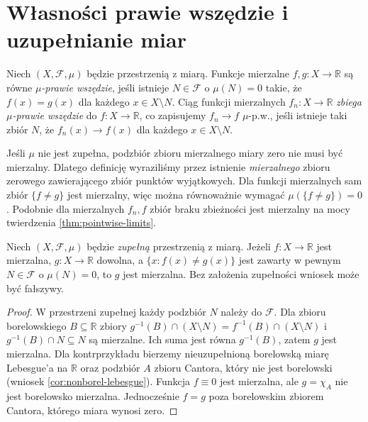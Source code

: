 \section{Własności prawie wszędzie i uzupełnianie miar}

\begin{definicja}
\label{def:ae-functions}
Niech $(X,\mathcal F,\mu)$ będzie przestrzenią z miarą.
Funkcje mierzalne $f,g:X\to\mathbb R$ są równe
\emph{$\mu$-prawie wszędzie}, jeśli istnieje
$N\in\mathcal F$ o $\mu(N)=0$ takie, że
$f(x)=g(x)$ dla każdego $x\in X\setminus N$.
Ciąg funkcji mierzalnych $f_n:X\to\mathbb R$
\emph{zbiega $\mu$-prawie wszędzie} do $f:X\to\mathbb R$,
co zapisujemy $f_n\to f$ $\mu$-p.w., jeśli istnieje
taki zbiór $N$, że $f_n(x)\to f(x)$ dla każdego
$x\in X\setminus N$.
\end{definicja}

\begin{uwaga}
Jeśli $\mu$ nie jest zupełna, podzbiór zbioru
mierzalnego miary zero nie musi być mierzalny.
Dlatego definicję wyraziliśmy przez istnienie
\emph{mierzalnego} zbioru zerowego zawierającego
zbiór punktów wyjątkowych. Dla funkcji mierzalnych
sam zbiór $\{f\ne g\}$ jest mierzalny, więc można
równoważnie wymagać $\mu(\{f\ne g\})=0$.
Podobnie dla mierzalnych $f_n,f$ zbiór braku
zbieżności jest mierzalny na mocy twierdzenia
\ref{thm:pointwise-limits}.
\end{uwaga}

\begin{twierdzenie}
\label{thm:null-modifications}
Niech $(X,\mathcal F,\mu)$ będzie \emph{zupełną}
przestrzenią z miarą. Jeżeli $f:X\to\mathbb R$
jest mierzalna, $g:X\to\mathbb R$ dowolna,
a $\{x:f(x)\ne g(x)\}$ jest zawarty w pewnym
$N\in\mathcal F$ o $\mu(N)=0$, to $g$ jest mierzalna.
Bez założenia zupełności wniosek może być fałszywy.
\end{twierdzenie}
\begin{proof}
W przestrzeni zupełnej każdy podzbiór $N$ należy
do $\mathcal F$. Dla zbioru borelowskiego
$B\subseteq\mathbb R$ zbiory
$g^{-1}(B)\cap(X\setminus N)=f^{-1}(B)\cap(X\setminus N)$
i $g^{-1}(B)\cap N\subseteq N$ są mierzalne.
Ich suma jest równa $g^{-1}(B)$, zatem $g$ jest mierzalna.
Dla kontrprzykładu bierzemy nieuzupełnioną borelowską
miarę Lebesgue'a na $\mathbb R$ oraz podzbiór
$A$ zbioru Cantora, który nie jest borelowski
(wniosek \ref{cor:nonborel-lebesgue}).
Funkcja $f\equiv0$ jest mierzalna, ale
$g=\chi_A$ nie jest borelowsko mierzalna.
Jednocześnie $f=g$ poza borelowskim zbiorem
Cantora, którego miara wynosi zero.
\end{proof}

